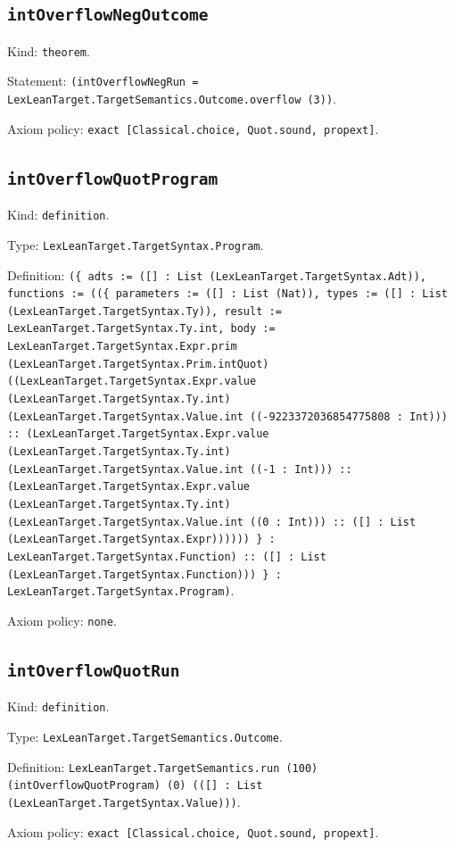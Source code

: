 \documentclass[11pt]{article}
\begin{document}
\subsection*{\texttt{intOverflowNegOutcome}}
\noindent Kind: \texttt{theorem}.\par
\noindent Statement: \texttt{(intOverflowNegRun = LexLeanTarget.TargetSemantics.Outcome.overflow (3))}.\par
\noindent Axiom policy: \texttt{exact [Classical.choice, Quot.sound, propext]}.\par
\subsection*{\texttt{intOverflowQuotProgram}}
\noindent Kind: \texttt{definition}.\par
\noindent Type: \texttt{LexLeanTarget.TargetSyntax.Program}.\par
\noindent Definition: \texttt{(\{ adts := ([] : List (LexLeanTarget.TargetSyntax.Adt)), functions := ((\{ parameters := ([] : List (Nat)), types := ([] : List (LexLeanTarget.TargetSyntax.Ty)), result := LexLeanTarget.TargetSyntax.Ty.int, body := LexLeanTarget.TargetSyntax.Expr.prim (LexLeanTarget.TargetSyntax.Prim.intQuot) ((LexLeanTarget.TargetSyntax.Expr.value (LexLeanTarget.TargetSyntax.Ty.int) (LexLeanTarget.TargetSyntax.Value.int ((-9223372036854775808 : Int))) :: (LexLeanTarget.TargetSyntax.Expr.value (LexLeanTarget.TargetSyntax.Ty.int) (LexLeanTarget.TargetSyntax.Value.int ((-1 : Int))) :: (LexLeanTarget.TargetSyntax.Expr.value (LexLeanTarget.TargetSyntax.Ty.int) (LexLeanTarget.TargetSyntax.Value.int ((0 : Int))) :: ([] : List (LexLeanTarget.TargetSyntax.Expr)))))) \} : LexLeanTarget.TargetSyntax.Function) :: ([] : List (LexLeanTarget.TargetSyntax.Function))) \} : LexLeanTarget.TargetSyntax.Program)}.\par
\noindent Axiom policy: \texttt{none}.\par
\subsection*{\texttt{intOverflowQuotRun}}
\noindent Kind: \texttt{definition}.\par
\noindent Type: \texttt{LexLeanTarget.TargetSemantics.Outcome}.\par
\noindent Definition: \texttt{LexLeanTarget.TargetSemantics.run (100) (intOverflowQuotProgram) (0) (([] : List (LexLeanTarget.TargetSyntax.Value)))}.\par
\noindent Axiom policy: \texttt{exact [Classical.choice, Quot.sound, propext]}.\par
\end{document}
